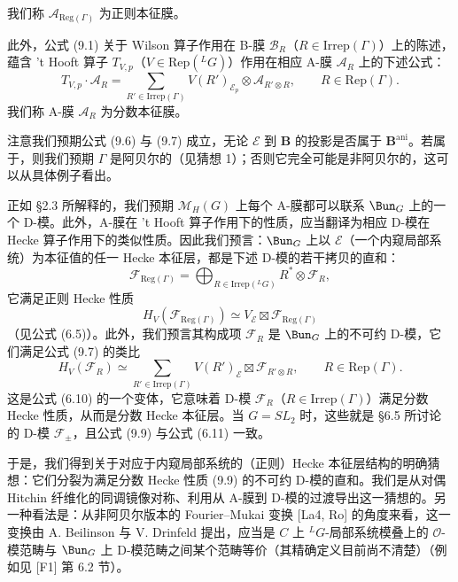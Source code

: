 
我们称 $\mathcal{A}_{\mathrm{Reg}(\Gamma)}$ 为正则本征膜。

此外，公式 (9.1) 关于 Wilson 算子作用在 B-膜 $\mathcal{B}_R$（$R\in\mathrm{Irrep}(\Gamma)$）上的陈述，蕴含 't Hooft 算子 $T_{V,p}$（$V\in\mathrm{Rep}({}^{L}G)$）作用在相应 A-膜 $\mathcal{A}_R$ 上的下述公式：
\begin{equation}\tag{9.7}
T_{V,p}\cdot\mathcal{A}_R = \sum_{R'\in\mathrm{Irrep}(\Gamma)}V(R')_{\mathcal{E}_p}\otimes\mathcal{A}_{R'\otimes R},
\qquad R\in\mathrm{Rep}(\Gamma).
\end{equation}
我们称 A-膜 $\mathcal{A}_R$ 为分数本征膜。

注意我们预期公式 (9.6) 与 (9.7) 成立，无论 $\mathcal{E}$ 到 $\boldsymbol{B}$ 的投影是否属于 $\boldsymbol{B}^{\mathrm{ani}}$。若属于，则我们预期 $\Gamma$ 是阿贝尔的（见猜想 1）；否则它完全可能是非阿贝尔的，这可以从具体例子看出。

正如 §2.3 所解释的，我们预期 $\mathcal{M}_H(G)$ 上每个 A-膜都可以联系 $\Bun_G$ 上的一个 D-模。此外，A-膜在 't Hooft 算子作用下的性质，应当翻译为相应 D-模在 Hecke 算子作用下的类似性质。因此我们预言：$\Bun_G$ 上以 $\mathcal{E}$（一个内窥局部系统）为本征值的任一 Hecke 本征层，都是下述 D-模的若干拷贝的直和：
\begin{equation}\tag{9.8}
\mathcal{F}_{\mathrm{Reg}(\Gamma)} = \bigoplus_{R\in\mathrm{Irrep}({}^{L}G)}R^*\otimes\mathcal{F}_R,
\end{equation}
它满足正则 Hecke 性质
\[
H_V(\mathcal{F}_{\mathrm{Reg}(\Gamma)})\simeq V_{\mathcal{E}}\boxtimes\mathcal{F}_{\mathrm{Reg}(\Gamma)}
\]
（见公式 (6.5)）。此外，我们预言其构成项 $\mathcal{F}_R$ 是 $\Bun_G$ 上的不可约 D-模，它们满足公式 (9.7) 的类比
\begin{equation}\tag{9.9}
H_V(\mathcal{F}_R)\simeq\sum_{R'\in\mathrm{Irrep}(\Gamma)}V(R')_{\mathcal{E}}\boxtimes\mathcal{F}_{R'\otimes R},
\qquad R\in\mathrm{Rep}(\Gamma).
\end{equation}
这是公式 (6.10) 的一个变体，它意味着 D-模 $\mathcal{F}_R$（$R\in\mathrm{Irrep}(\Gamma)$）满足分数 Hecke 性质，从而是分数 Hecke 本征层。当 $G=SL_2$ 时，这些就是 §6.5 所讨论的 D-模 $\mathcal{F}_\pm$，且公式 (9.9) 与公式 (6.11) 一致。

于是，我们得到关于对应于内窥局部系统的（正则）Hecke 本征层结构的明确猜想：它们分裂为满足分数 Hecke 性质 (9.9) 的不可约 D-模的直和。我们是从对偶 Hitchin 纤维化的同调镜像对称、利用从 A-膜到 D-模的过渡导出这一猜想的。另一种看法是：从非阿贝尔版本的 Fourier--Mukai 变换 [La4, Ro] 的角度来看，这一变换由 A. Beilinson 与 V. Drinfeld 提出，应当是 $C$ 上 ${}^{L}G$-局部系统模叠上的 $\mathcal{O}$-模范畴与 $\Bun_G$ 上 D-模范畴之间某个范畴等价（其精确定义目前尚不清楚）（例如见 [F1] 第 6.2 节）。

